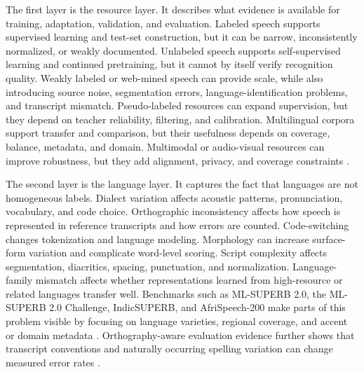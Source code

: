 \documentclass[pdflatex,sn-basic]{sn-jnl}
\theoremstyle{thmstyleone}
\theoremstyle{thmstyletwo}
\theoremstyle{thmstylethree}
\begin{document}
The first layer is the resource layer. It describes what evidence is available for training, adaptation, validation, and evaluation. Labeled speech supports supervised learning and test-set construction, but it can be narrow, inconsistently normalized, or weakly documented. Unlabeled speech supports self-supervised learning and continued pretraining, but it cannot by itself verify recognition quality. Weakly labeled or web-mined speech can provide scale, while also introducing source noise, segmentation errors, language-identification problems, and transcript mismatch. Pseudo-labeled resources can expand supervision, but they depend on teacher reliability, filtering, and calibration. Multilingual corpora support transfer and comparison, but their usefulness depends on coverage, balance, metadata, and domain. Multimodal or audio-visual resources can improve robustness, but they add alignment, privacy, and coverage constraints \citep{ardila2020commonvoice,wang2021voxpopuli,pratap20_interspeech,lau2025_data_quality_multilingual_speech}.

The second layer is the language layer. It captures the fact that languages are not homogeneous labels. Dialect variation affects acoustic patterns, pronunciation, vocabulary, and code choice. Orthographic inconsistency affects how speech is represented in reference transcripts and how errors are counted. Code-switching changes tokenization and language modeling. Morphology can increase surface-form variation and complicate word-level scoring. Script complexity affects segmentation, diacritics, spacing, punctuation, and normalization. Language-family mismatch affects whether representations learned from high-resource or related languages transfer well. Benchmarks such as ML-SUPERB 2.0, the ML-SUPERB 2.0 Challenge, IndicSUPERB, and AfriSpeech-200 make parts of this problem visible by focusing on language varieties, regional coverage, and accent or domain metadata \citep{shi2024mlsuperb2,chen2025mlsuperb2challenge,javed2023indsuperb,olatunji2023_afrispeech200}. Orthography-aware evaluation evidence further shows that transcript conventions and naturally occurring spelling variation can change measured error rates \citep{karita2023lenient}.
\end{document}
